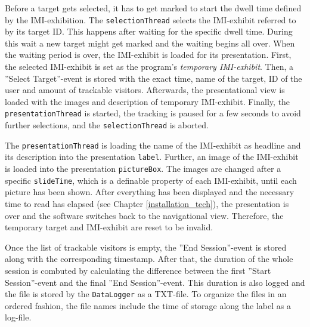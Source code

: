 Before a target gets selected, it has to get marked to start the dwell time defined by the \ac{IMI}-exhibition. The \texttt{selectionThread} selects the \ac{IMI}-exhibit referred to by its target \ac{ID}. This happens after waiting for the specific dwell time. During this wait a new target might get marked and the waiting begins all over. When the waiting period is over, the \ac{IMI}-exhibit is loaded for its presentation. First, the selected \ac{IMI}-exhibit is set as the program's \textit{temporary \ac{IMI}-exhibit}. Then, a ''Select Target''-event is stored with the exact time, name of the target, ID of the user and amount of trackable visitors. Afterwards, the presentational view is loaded with the images and description of temporary \ac{IMI}-exhibit. Finally, the \texttt{presentationThread} is started, the tracking is paused for a few seconds to avoid further selections, and the \texttt{selectionThread} is aborted.

The \texttt{presentationThread} is loading the name of the \ac{IMI}-exhibit as headline and its description into the presentation \texttt{label}. Further, an image of the \ac{IMI}-exhibit is loaded into the presentation \texttt{pictureBox}. The images are changed after a specific \texttt{slideTime}, which is a definable property of each \ac{IMI}-exhibit, until each picture has been shown. After everything has been displayed and the necessary time to read has elapsed (see Chapter \ref{installation_tech}), the presentation is over and the software switches back to the navigational view. Therefore, the temporary target and \ac{IMI}-exhibit are reset to be invalid.

Once the list of trackable visitors is empty, the ''End Session''-event is stored along with the corresponding timestamp. After that, the duration of the whole session is combuted by calculating the difference between the first ''Start Session''-event and  the final ''End Session''-event. This duration is also logged and the file is stored by the \texttt{DataLogger} as a TXT-file. To organize the files in an ordered fashion, the file names include the time of storage along the label as a log-file.

